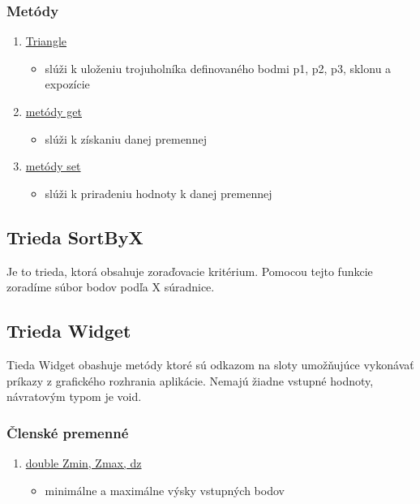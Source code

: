 \documentclass[12pt]{article}
\begin{document}
\subsubsection{Metódy}
\begin{enumerate}
\item[] \underline{Triangle}
\begin{itemize}
\item slúži k uloženiu trojuholníka definovaného bodmi p1, p2, p3, sklonu a expozície
\end{itemize}

\item[] \underline{metódy get}
\begin{itemize}
\item slúži k získaniu danej premennej
\end{itemize}

\item[] \underline{metódy set}
\begin{itemize}
\item slúži k priradeniu hodnoty k danej premennej
\end{itemize}
\end{enumerate}

\subsection{Trieda SortByX}
Je to trieda, ktorá obsahuje zoraďovacie kritérium. Pomocou tejto funkcie zoradíme súbor bodov podľa X súradnice.

\subsection{Trieda Widget}
Tieda Widget obashuje metódy ktoré sú odkazom na sloty umožňujúce vykonávať príkazy z grafického rozhrania aplikácie. Nemajú žiadne vstupné hodnoty, návratovým typom je void.

\subsubsection{Členské premenné}
\begin{enumerate}
\item[] \underline {double Zmin, Zmax, dz}
\begin{itemize}
\item minimálne a maximálne výsky vstupných bodov
\end{itemize}
\end{enumerate}
\end{document}

